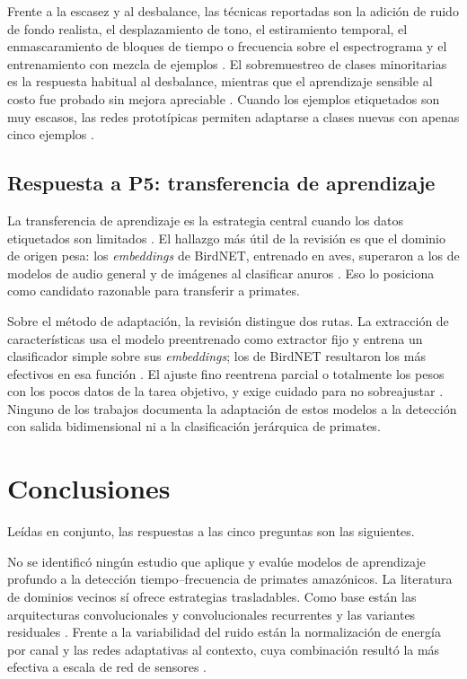Frente a la escasez y al desbalance, las técnicas reportadas son la adición de
ruido de fondo realista, el desplazamiento de tono, el estiramiento temporal, el
enmascaramiento de bloques de tiempo o frecuencia sobre el espectrograma y el
entrenamiento con mezcla de ejemplos
\citep{kahl_birdnet_2021,lostanlen_robust_2019,politis_dataset_2020}. El
sobremuestreo de clases minoritarias es la respuesta habitual al desbalance,
mientras que el aprendizaje sensible al costo fue probado sin mejora apreciable
\citep{kahl_birdnet_2021}. Cuando los ejemplos etiquetados son muy escasos, las
redes prototípicas permiten adaptarse a clases nuevas con apenas cinco ejemplos
\citep{nolasco_learning_2023}.

\subsection{Respuesta a P5: transferencia de aprendizaje}

La transferencia de aprendizaje es la estrategia central cuando los datos
etiquetados son limitados \citep{kath_leveraging_2024}. El hallazgo más útil de
la revisión es que el dominio de origen pesa: los \textit{embeddings} de BirdNET,
entrenado en aves, superaron a los de modelos de audio general y de imágenes al
clasificar anuros \citep{kath_leveraging_2024}. Eso lo posiciona como candidato razonable para
transferir a primates.

Sobre el método de adaptación, la revisión distingue dos rutas. La extracción de
características usa el modelo preentrenado como extractor fijo y entrena un
clasificador simple sobre sus \textit{embeddings}; los de BirdNET resultaron los
más efectivos en esa función \citep{kath_leveraging_2024}. El
ajuste fino reentrena parcial o totalmente los pesos con los pocos datos de la
tarea objetivo, y exige cuidado para no sobreajustar \citep{nolasco_learning_2023}.
Ninguno de los trabajos documenta la adaptación de estos modelos a la detección
con salida bidimensional ni a la clasificación jerárquica de primates.

\section{Conclusiones}
\label{sec:sintesis-revision}

Leídas en conjunto, las respuestas a las cinco preguntas son las siguientes.

 No se identificó ningún estudio que
aplique y evalúe modelos de aprendizaje profundo a la detección
tiempo--frecuencia de primates amazónicos. La literatura de dominios vecinos sí
ofrece estrategias trasladables. Como base están las arquitecturas
convolucionales y convolucionales recurrentes
\citep{lostanlen_robust_2019,politis_dataset_2020} y las variantes residuales
\citep{he_deep_2016}. Frente a la variabilidad del ruido están la normalización
de energía por canal y las redes adaptativas al contexto, cuya combinación
resultó la más efectiva a escala de red de sensores
\citep{lostanlen_robust_2019}.

